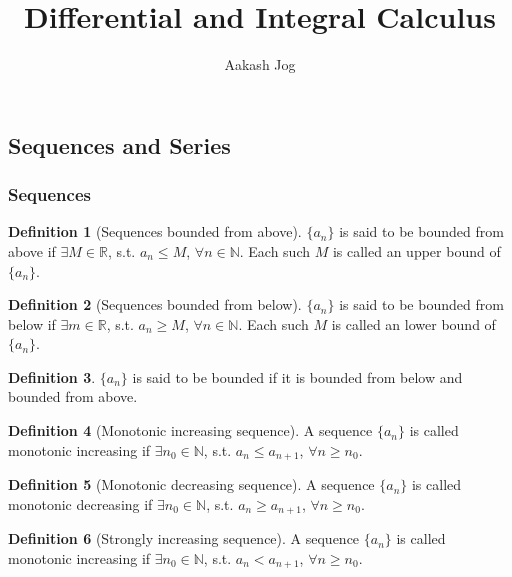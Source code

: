 \documentclass[fleqn, a4paper, 8pt, twoside]{amsart}
\title{\Huge Differential and Integral Calculus}
\author{Aakash Jog}
\date{\formatdate{3}{7}{2015}}
\theoremstyle{definition}
\theoremstyle{bluedefinition}
\newtheorem{definition}{Definition}
\theoremstyle{redtheorem}
\begin{document}
\maketitle

\setlength{\mathindent}{0pt}

\begin{multicols}{2}

\begin{spacing}{0.7}

\part{Sequences and Series}

\section{Sequences}

\begin{definition}[Sequences bounded from above]
	$\{a_n\}$ is said to be bounded from above if $\exists M \in \mathbb{R}$, s.t. $a_n \leq M$, $\forall n \in \mathbb{N}$.
	Each such $M$ is called an upper bound of $\{a_n\}$.
\end{definition}

\begin{definition}[Sequences bounded from below]
	$\{a_n\}$ is said to be bounded from below if $\exists m \in \mathbb{R}$, s.t. $a_n \geq M$, $\forall n \in \mathbb{N}$.
	Each such $M$ is called an lower bound of $\{a_n\}$.
\end{definition}

\begin{definition}
	$\{a_n\}$ is said to be bounded if it is bounded from below and bounded from above.
\end{definition}

\begin{definition}[Monotonic increasing sequence]
	A sequence $\{a_n\}$ is called monotonic increasing if $\exists n_0 \in \mathbb{N}$, s.t. $a_n \leq a_{n + 1}$, $\forall n \geq n_0$.
\end{definition}

\begin{definition}[Monotonic decreasing sequence]
	A sequence $\{a_n\}$ is called monotonic decreasing if $\exists n_0 \in \mathbb{N}$, s.t. $a_n \geq a_{n + 1}$, $\forall n \geq n_0$.
\end{definition}

\begin{definition}[Strongly increasing sequence]
	A sequence $\{a_n\}$ is called monotonic increasing if $\exists n_0 \in \mathbb{N}$, s.t. $a_n < a_{n + 1}$, $\forall n \geq n_0$.
\end{definition}


\end{spacing}
\end{multicols}
\end{document}
